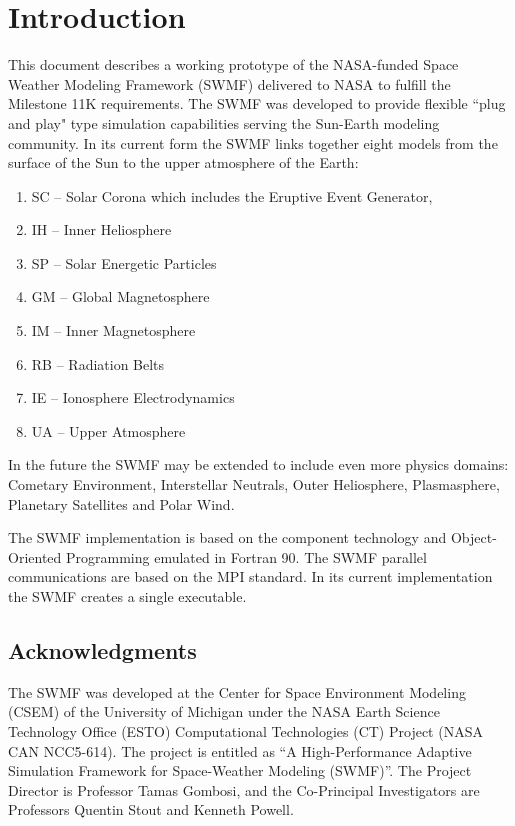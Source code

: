 


\chapter{Introduction}

This document describes a working prototype of the NASA-funded Space
Weather Modeling Framework (SWMF) delivered to NASA to fulfill the
Milestone 11K requirements. The SWMF was developed to provide flexible
``plug and play" type simulation capabilities serving the Sun-Earth
modeling community.  In its current form the SWMF links together eight
models from the surface of the Sun to the upper atmosphere of the Earth: 
\begin{enumerate}
\item SC -- Solar Corona which includes the Eruptive Event Generator,
\item IH -- Inner Heliosphere
\item SP -- Solar Energetic Particles 
\item GM -- Global Magnetosphere 
\item IM -- Inner Magnetosphere
\item RB -- Radiation Belts
\item IE -- Ionosphere Electrodynamics
\item UA -- Upper Atmosphere
\end{enumerate}
In the future the SWMF may be extended to include even more 
physics domains: Cometary Environment, Interstellar
Neutrals, Outer Heliosphere, Plasmasphere, Planetary Satellites and
Polar Wind. 

The SWMF implementation is based on the component technology and
Object-Oriented Programming emulated in Fortran 90.  The SWMF parallel
communications are based on the MPI standard.  In its current
implementation the SWMF creates a single executable.

\section{Acknowledgments}

The SWMF was developed at the Center for Space Environment Modeling
(CSEM) of the University of Michigan under the NASA Earth Science
Technology Office (ESTO) Computational Technologies (CT) Project (NASA
CAN NCC5-614). The project is entitled as ``A High-Performance
Adaptive Simulation Framework for Space-Weather Modeling (SWMF)''.
The Project Director is Professor Tamas Gombosi, and the Co-Principal
Investigators are Professors Quentin Stout and Kenneth Powell.

